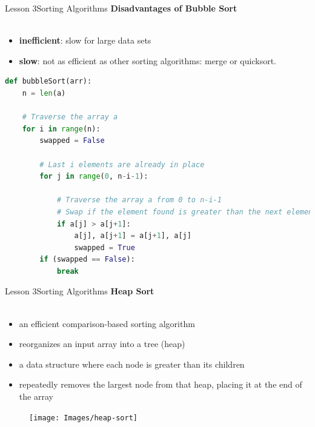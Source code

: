 \documentclass[aspectratio=1610]{beamer}
\begin{document}
\begin{frame}{Lesson 3}{Sorting Algorithms}
\LARGE
\textbf{Disadvantages of Bubble Sort}\\~\\
\Large
\begin{itemize}
	\item \textbf{inefficient}: slow for large data sets
	\item \textbf{slow}: not as efficient as other sorting algorithms: merge or quicksort.
\end{itemize}

\end{frame}


\begin{frame}[fragile]
\begin{lstlisting}[language=Python]
def bubbleSort(arr):
    n = len(a)
    
    # Traverse the array a
    for i in range(n):
        swapped = False

        # Last i elements are already in place
        for j in range(0, n-i-1):

            # Traverse the array a from 0 to n-i-1
            # Swap if the element found is greater than the next element
            if a[j] > a[j+1]:
                a[j], a[j+1] = a[j+1], a[j]
                swapped = True
        if (swapped == False):
            break
\end{lstlisting}
\end{frame}





\begin{frame}{Lesson 3}{Sorting Algorithms}
\LARGE
\textbf{Heap Sort}\\~\\
\begin{minipage}{0.65\textwidth}
\Large
\begin{itemize}
    \item an efficient comparison-based sorting algorithm
    \item reorganizes an input array into a tree (heap)
    \item a data structure where each node is greater than its children
    \item repeatedly removes the largest node from that heap, placing it at the end of the array
\end{itemize}
  \end{minipage}
\begin{minipage}{.0\textwidth}
      \begin{figure}
        \texttt{[image: Images/heap-sort]}
      \end{figure}
  \end{minipage}  
\end{frame}
\end{document}
